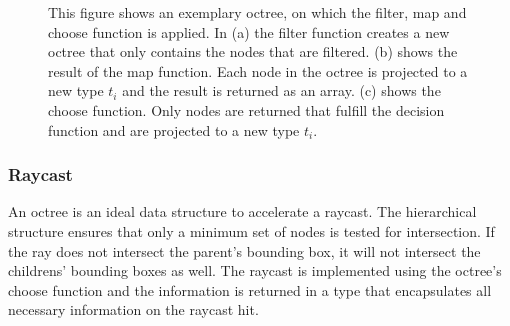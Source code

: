 \begin{figure}
\centering
{}\par\medskip
{}\par\medskip        
{}
\caption{This figure shows an exemplary octree, on which the filter, map and choose function is applied. In (a) the filter function creates a new octree that only contains the nodes that are filtered. (b) shows the result of the map function. Each node in the octree is projected to a new type $t_{i}$ and the result is returned as an array. (c) shows the choose function. Only nodes are returned that fulfill the decision function and are projected to a new type $t_{i}$. }
\label{fig:octreeFuns}
\end{figure}



\subsubsection{Raycast}

An octree is an ideal data structure to accelerate a raycast. The hierarchical structure ensures that only a minimum set of nodes is tested for intersection. If the ray does not intersect the parent's bounding box, it will not intersect the childrens' bounding boxes as well. The raycast is implemented using the octree's choose function and the information is returned in a type that encapsulates all necessary information on the raycast hit. 


